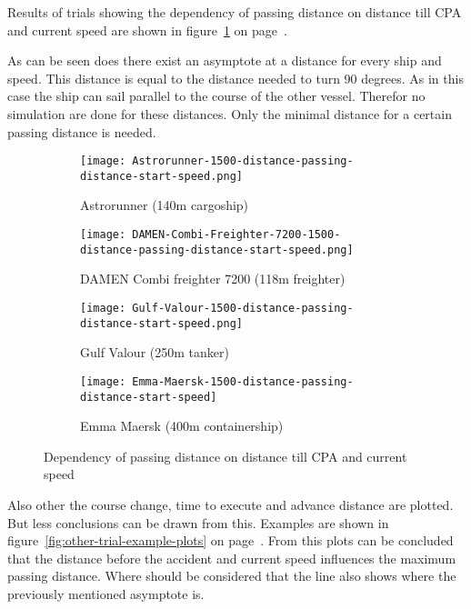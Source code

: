 Results of trials showing the dependency of passing distance on distance till CPA and current speed are shown in figure~\ref{fig:result-distance-passing-distance-start-speed} on page~\pageref{fig:result-distance-passing-distance-start-speed}.

As can be seen does there exist an asymptote at a distance for every ship and speed. This distance is equal to the distance needed to turn 90 degrees. As in this case the ship can sail parallel to the course of the other vessel. Therefor no simulation are done for these distances. Only the minimal distance for a certain passing distance is needed. 

\begin{figure}[ht]
	\begin{subfigure}[b]{0.5\linewidth}
		\texttt{[image: Astrorunner-1500-distance-passing-distance-start-speed.png]} 
		\caption{Astrorunner (140m  cargoship)} 
	\end{subfigure} 
	\begin{subfigure}[b]{0.5\linewidth}
		\texttt{[image: DAMEN-Combi-Freighter-7200-1500-distance-passing-distance-start-speed.png]} 
		\caption{DAMEN Combi freighter 7200 (118m freighter)} 
	\end{subfigure} 
	\begin{subfigure}[b]{0.5\linewidth}
		\texttt{[image: Gulf-Valour-1500-distance-passing-distance-start-speed.png]} 
		\caption{Gulf Valour (250m tanker)} 
	\end{subfigure}
	\hfill
	\begin{subfigure}[b]{0.5\linewidth}
		\texttt{[image: Emma-Maersk-1500-distance-passing-distance-start-speed]} 
		\caption{Emma Maersk (400m containership)} 
	\end{subfigure}
	\caption{Dependency of passing distance on distance till CPA and current speed} 
	\label{fig:result-distance-passing-distance-start-speed} 
\end{figure}

Also other the course change, time to execute and advance distance are plotted. But less conclusions can be drawn from this. Examples are shown in figure~\ref{fig:other-trial-example-plots} on page~\pageref{fig:other-trial-example-plots}.
From this plots can be concluded that the distance before the accident and current speed influences the maximum passing distance. Where should be considered that the line also shows where the previously mentioned asymptote is.


